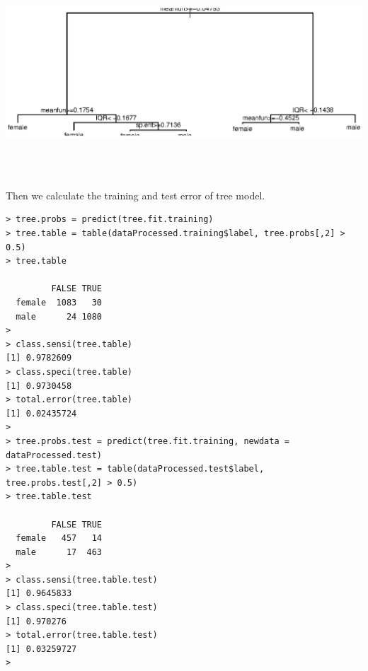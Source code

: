 \documentclass{article}%
\begin{document}
\includegraphics[width = \textwidth, height = 8.5cm]{Rplot_tree_branch.eps}
Then we calculate the training and test error of tree model.
\begin{verbatim}> tree.probs = predict(tree.fit.training)
> tree.table = table(dataProcessed.training$label, tree.probs[,2] > 0.5)
> tree.table

         FALSE TRUE
  female  1083   30
  male      24 1080
>
> class.sensi(tree.table)
[1] 0.9782609
> class.speci(tree.table)
[1] 0.9730458
> total.error(tree.table)
[1] 0.02435724
>
> tree.probs.test = predict(tree.fit.training, newdata = dataProcessed.test)
> tree.table.test = table(dataProcessed.test$label, tree.probs.test[,2] > 0.5)
> tree.table.test

         FALSE TRUE
  female   457   14
  male      17  463
>
> class.sensi(tree.table.test)
[1] 0.9645833
> class.speci(tree.table.test)
[1] 0.970276
> total.error(tree.table.test)
[1] 0.03259727
> \end{verbatim}
\end{document}

